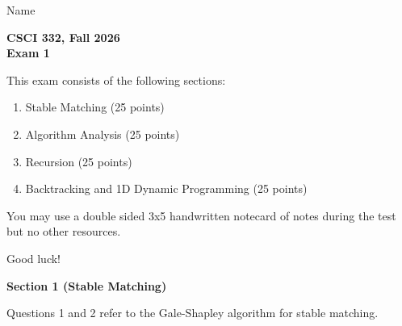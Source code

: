 \documentclass[11pt]{article}
\begin{document}
\noindent Name \underline{\hspace{12cm}}\\

\begin{center}
\Large\textbf{CSCI 332, Fall 2026}\\
\LARGE\textbf{Exam 1}
\end{center}

\noindent This exam consists of the following sections:
\begin{enumerate}
    \item Stable Matching (25 points)
    \item Algorithm Analysis (25 points)
    \item Recursion (25 points)
    \item Backtracking and 1D Dynamic Programming (25 points)
\end{enumerate}

You may use a double sided 3x5 handwritten notecard of notes during the test but no other resources.

Good luck!

\newpage

\begin{center}
\LARGE\textbf{Section 1 (Stable Matching)\\}%
\end{center}

Questions 1 and 2 refer to the Gale-Shapley algorithm for
stable matching.
\end{document}
